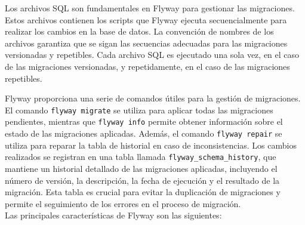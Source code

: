 \documentclass{IEEEtran}
\begin{document}
Los archivos SQL son fundamentales en Flyway para gestionar las migraciones. Estos archivos contienen los scripts que Flyway ejecuta secuencialmente para realizar los cambios en la base de datos. La convención de nombres de los archivos garantiza que se sigan las secuencias adecuadas para las migraciones versionadas y repetibles. Cada archivo SQL es ejecutado una sola vez, en el caso de las migraciones versionadas, y repetidamente, en el caso de las migraciones repetibles.

Flyway proporciona una serie de comandos útiles para la gestión de migraciones. El comando \texttt{flyway migrate} se utiliza para aplicar todas las migraciones pendientes, mientras que \texttt{flyway info} permite obtener información sobre el estado de las migraciones aplicadas. Además, el comando \texttt{flyway repair} se utiliza para reparar la tabla de historial en caso de inconsistencias. Los cambios realizados se registran en una tabla llamada \texttt{flyway\_schema\_history}, que mantiene un historial detallado de las migraciones aplicadas, incluyendo el número de versión, la descripción, la fecha de ejecución y el resultado de la migración. Esta tabla es crucial para evitar la duplicación de migraciones y permite el seguimiento de los errores en el proceso de migración. \\

Las principales características de Flyway son las siguientes:
\end{document}
